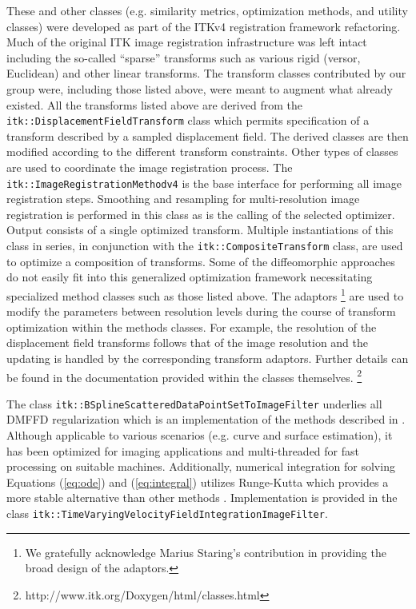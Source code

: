 \documentclass{frontiersSCNS}
\begin{document}
These and other classes (e.g. similarity metrics, optimization methods, and
utility classes) were developed as part of the ITKv4 registration
framework refactoring.  Much of the original ITK image registration infrastructure 
was left intact including the so-called ``sparse'' transforms such as various
rigid (versor, Euclidean) and other linear transforms.  The transform classes
contributed by our group were, including those listed above, were meant to 
augment what already existed.  All the transforms listed above are derived from
the {\tt itk::DisplacementFieldTransform} class which permits specification of 
a transform described by a sampled displacement field.  The derived classes are
then modified according to the different transform constraints. Other types
of classes are used to coordinate the image registration process.  The {\tt itk::ImageRegistrationMethodv4} is the base interface for performing all 
image registration steps.  Smoothing and resampling for multi-resolution
image registration is performed in this class as is the calling of the
selected optimizer.  Output consists of a single optimized transform.
Multiple instantiations of this class in series, in conjunction with the 
{\tt itk::CompositeTransform} class, are used to optimize a composition of transforms.
Some of the diffeomorphic approaches do not easily fit into this
generalized optimization framework necessitating specialized method classes such as
those listed above.  The adaptors%
\footnote{
We gratefully acknowledge Marius Staring's contribution in providing the broad
design of the adaptors.
}
are used to modify the parameters between resolution levels during the course
of transform optimization within the methods classes.  For example, the 
resolution of the displacement field transforms follows that of the image 
resolution and the updating is handled by the corresponding transform adaptors.
Further details can be found in the documentation
provided within the classes themselves.%
\footnote{
http://www.itk.org/Doxygen/html/classes.html
}

The class {\tt itk::BSplineScatteredDataPointSetToImageFilter} underlies all DMFFD regularization which is an implementation of the 
methods described in \cite{tustison2006}.  Although applicable to
various scenarios (e.g. curve and surface estimation), it has
been optimized for imaging applications and multi-threaded
for fast processing on suitable machines.
Additionally, numerical integration for solving Equations (\ref{eq:ode}) and (\ref{eq:integral}) utilizes Runge-Kutta which
provides a more stable alternative than other
methods \citep{press2007}.  Implementation is provided in the class {\tt itk::TimeVaryingVelocityFieldIntegrationImageFilter}.
\end{document}
